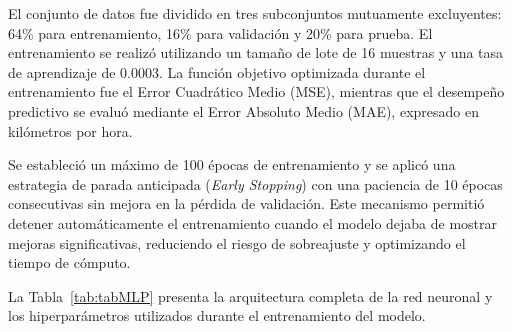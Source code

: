 \documentclass[esp]{SpeedEstimationAI_paper}
\begin{document}
El conjunto de datos fue dividido en tres subconjuntos mutuamente excluyentes: 64\% para entrenamiento, 16\% para validación y 20\% para prueba. El entrenamiento se realizó utilizando un tamaño de lote de 16 muestras y una tasa de aprendizaje de 0.0003. La función objetivo optimizada durante el entrenamiento fue el Error Cuadrático Medio (MSE), mientras que el desempeño predictivo se evaluó mediante el Error Absoluto Medio (MAE), expresado en kilómetros por hora.

Se estableció un máximo de 100 épocas de entrenamiento y se aplicó una estrategia de parada anticipada (\textit{Early Stopping}) con una paciencia de 10 épocas consecutivas sin mejora en la pérdida de validación. Este mecanismo permitió detener automáticamente el entrenamiento cuando el modelo dejaba de mostrar mejoras significativas, reduciendo el riesgo de sobreajuste y optimizando el tiempo de cómputo.

La Tabla~\ref{tab:tabMLP} presenta la arquitectura completa de la red neuronal y los hiperparámetros utilizados durante el entrenamiento del modelo.
\end{document}
